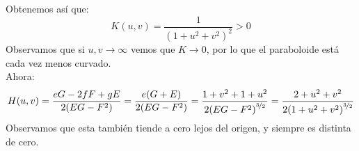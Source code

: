 \begin{ejercicio}
    \noindent
    Obtenemos así que:
    \begin{equation*}
        K(u,v) = \frac{1}{{(1+u^2+v^2)}^{2}} > 0
    \end{equation*}
    Observamos que si $u,v\to \infty$ vemos que $K\to 0$, por lo que el paraboloide está cada vez menos curvado.\\

    \noindent
    Ahora:
    \begin{equation*}
        H(u,v) = \frac{eG-2fF+gE}{2(EG-F^2)} = \frac{e(G+E)}{2(EG-F^2)} = \frac{1+v^2+1+u^2}{2{(EG-F^2)}^{\nicefrac{3}{2}}} = \frac{2+u^2+v^2}{2{(1+u^2+v^2)}^{\nicefrac{3}{2}}}
    \end{equation*}
    Observamos que esta también tiende a cero lejos del origen, y siempre es distinta de cero.
\end{ejercicio}

